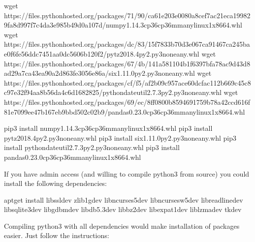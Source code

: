 \documentclass[letterpaper,10pt,english]{sphinxmanual}
\begin{document}
%
\begin{sphinxVerbatim}[commandchars=\\\{\}]
wget https://files.pythonhosted.org/packages/71/90/ca61e203e0080a8cef7ac21eca199829fa8d997f7c4da3e985b49d0a107d/numpy\PYGZhy{}1.14.3\PYGZhy{}cp36\PYGZhy{}cp36m\PYGZhy{}manylinux1\PYGZus{}x86\PYGZus{}64.whl
wget https://files.pythonhosted.org/packages/dc/83/15f7833b70d3e067ca91467ca245bae0f6fe56ddc7451aa0dc5606b120f2/pytz\PYGZhy{}2018.4\PYGZhy{}py2.py3\PYGZhy{}none\PYGZhy{}any.whl
wget https://files.pythonhosted.org/packages/67/4b/141a581104b1f6397bfa78ac9d43d8ad29a7ca43ea90a2d863fe3056e86a/six\PYGZhy{}1.11.0\PYGZhy{}py2.py3\PYGZhy{}none\PYGZhy{}any.whl
wget https://files.pythonhosted.org/packages/cf/f5/af2b09c957ace60dcfac112b669c45c8c97e32f94aa8b56da4c6d1682825/python\PYGZus{}dateutil\PYGZhy{}2.7.3\PYGZhy{}py2.py3\PYGZhy{}none\PYGZhy{}any.whl
wget https://files.pythonhosted.org/packages/69/ec/8ff0800b8594691759b78a42ccd616f81e7099ee47b167eb9bbd502c02b9/pandas\PYGZhy{}0.23.0\PYGZhy{}cp36\PYGZhy{}cp36m\PYGZhy{}manylinux1\PYGZus{}x86\PYGZus{}64.whl

pip3 install numpy\PYGZhy{}1.14.3\PYGZhy{}cp36\PYGZhy{}cp36m\PYGZhy{}manylinux1\PYGZus{}x86\PYGZus{}64.whl
pip3 install pytz\PYGZhy{}2018.4\PYGZhy{}py2.py3\PYGZhy{}none\PYGZhy{}any.whl
pip3 install six\PYGZhy{}1.11.0\PYGZhy{}py2.py3\PYGZhy{}none\PYGZhy{}any.whl
pip3 install python\PYGZus{}dateutil\PYGZhy{}2.7.3\PYGZhy{}py2.py3\PYGZhy{}none\PYGZhy{}any.whl
pip3 install pandas\PYGZhy{}0.23.0\PYGZhy{}cp36\PYGZhy{}cp36m\PYGZhy{}manylinux1\PYGZus{}x86\PYGZus{}64.whl
\end{sphinxVerbatim}

If you have admin access (and willing to compile python3 from source) you could
install the following dependencies:

%
\begin{sphinxVerbatim}[commandchars=\\\{\}]
apt\PYGZhy{}get install libssl\PYGZhy{}dev zlib1g\PYGZhy{}dev libncurses5\PYGZhy{}dev 
libncursesw5\PYGZhy{}dev libreadline\PYGZhy{}dev libsqlite3\PYGZhy{}dev libgdbm\PYGZhy{}dev 
libdb5.3\PYGZhy{}dev libbz2\PYGZhy{}dev libexpat1\PYGZhy{}dev liblzma\PYGZhy{}dev tk\PYGZhy{}dev
\end{sphinxVerbatim}

Compiling python3 with all dependencies would make installation of packages
easier. Just follow the instructions:
\end{document}
